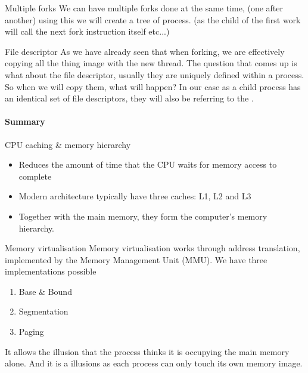 \documentclass[a4paper]{book}
\begin{document}
\begin{parag}{Multiple forks}
    We can have multiple forks done at the same time, (one after another) using this we will create a tree of process. (as the child of the first work will call the next fork instruction itself etc...)
\end{parag}

\begin{parag}{File descriptor}
    As we have already seen that when forking, we are effectively copying all the thing image with the new thread. The question that comes up is what about the file descriptor, usually they are uniquely defined within a process. So when we will copy them, what will happen? In our case as a child process has an identical set of file descriptors, they will also be referring to the  .
	
\end{parag}

\paragraph{Summary}%
\label{par:Summary}
\begin{parag}{CPU caching \& memory hierarchy}
    \begin{itemize}
        \item Reduces the amount of time that the CPU waits for memory access to complete
        \item Modern architecture typically have three caches: L1, L2 and L3
        \item Together with the main memory, they form the computer's memory hierarchy.
    \end{itemize}
\end{parag}

\begin{parag}{Memory virtualisation}
    Memory virtualisation works through address translation, implemented by the Memory Management Unit (MMU). We have three implementations possible 
	\begin{enumerate}
		\item Base \& Bound
		\item Segmentation
		\item Paging
	\end{enumerate}
	
	It allows the illusion that the process thinks it is occupying the main memory alone. And it is a  illusions as each process can only touch its own memory image.
\end{parag}
\end{document}
